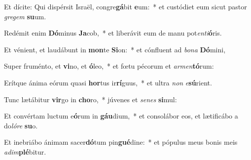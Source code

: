 \item Et dícite: Qui dispérsit Israël, congre\textbf{gá}bit \textbf{e}um:~* et custódiet eum sicut pastor \textit{gre}\textit{gem} \textbf{su}um.
\item Redémit enim \textbf{Dó}minus \textbf{Ja}cob,~* et liberávit eum de manu pot\textit{en}\textit{ti}\textbf{ó}ris.
\item Et vénient, et laudábunt in \textbf{mon}te \textbf{Si}on:~* et cónfluent ad \textit{bo}\textit{na} \textbf{Dó}mini,
\item Super fruménto, et \textbf{vi}no, et \textbf{ó}leo,~* et fœtu pécorum et \textit{ar}\textit{men}\textbf{tó}rum:
\item Erítque ánima eórum quasi \textbf{hor}tus ir\textbf{rí}guus,~* et ultra \textit{non} \textit{e}\textbf{sú}rient.
\item Tunc lætábitur \textbf{vir}go in \textbf{cho}ro,~* júvenes et \textit{se}\textit{nes} \textbf{si}mul:
\item Et convértam luctum e\textbf{ó}rum in \textbf{gáu}dium,~* et consolábor eos, et lætificábo a do\textit{ló}\textit{re} \textbf{su}o.
\item Et inebriábo ánimam sacer\textbf{dó}tum pin\textbf{gué}dine:~* et pópulus meus bonis meis \textit{ad}\textit{im}\textbf{plé}bitur.
